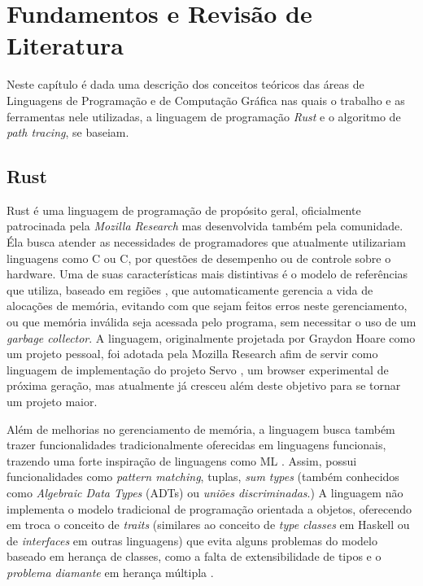 \documentclass[tg]{mdtufsm}
\def\Cpp{{C\nolinebreak[4]\raisebox{.20ex}{\small\bf++}}}
\begin{document}
\chapter{Fundamentos e Revisão de Literatura}

Neste capítulo é dada uma descrição dos conceitos teóricos das áreas de Linguagens de Programação e de Computação Gráfica nas quais o trabalho e as ferramentas nele utilizadas, a linguagem de programação \emph{Rust} e o algoritmo de \emph{path tracing}, se baseiam.

\section{Rust}

Rust \citep{rust} é uma linguagem de programação de propósito geral, oficialmente patrocinada pela
\emph{Mozilla Research} mas desenvolvida também pela comunidade. Éla busca atender as necessidades
de programadores que atualmente utilizariam linguagens como C ou
\Cpp, por questões de desempenho ou de controle sobre o hardware. Uma de suas características mais
distintivas é o modelo de referências que utiliza, baseado em regiões \citep{tofte1997}, que
automaticamente gerencia a vida de alocações de memória, evitando com que sejam feitos erros neste
gerenciamento, ou que memória inválida seja acessada pelo programa, sem necessitar o uso de um
\emph{garbage collector}. A linguagem, originalmente projetada por Graydon Hoare como um projeto
pessoal, foi adotada pela Mozilla Research afim de servir como linguagem de
implementação do projeto Servo \citep{servo}, um browser experimental de próxima geração, mas
atualmente já cresceu além deste objetivo para se tornar um projeto maior.

Além de melhorias no gerenciamento de memória, a linguagem busca também trazer funcionalidades
tradicionalmente oferecidas em linguagens funcionais, trazendo uma forte inspiração de linguagens
como ML \citep{milner1997}. Assim, possui funcionalidades como \emph{pattern matching}, tuplas,
\emph{sum types} (também conhecidos como \emph{Algebraic Data Types} (ADTs) ou \emph{uniões
discriminadas}.) A linguagem não implementa o modelo tradicional de programação orientada a objetos,
oferecendo em troca o conceito de \emph{traits} (similares ao conceito de \emph{type classes} em
Haskell ou de \emph{interfaces} em outras linguagens) que evita alguns problemas do modelo baseado
em herança de classes, como a falta de extensibilidade de tipos e o \emph{problema diamante} em
herança múltipla \citep{scharli2003}.
\end{document}
